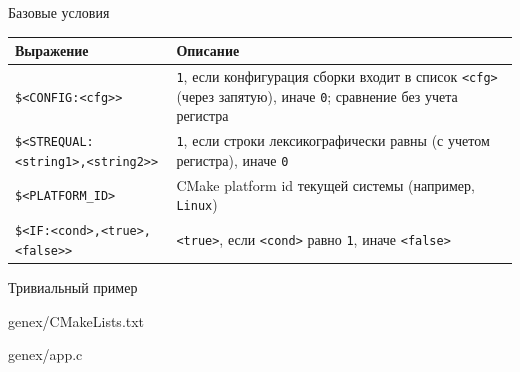 \documentclass[compress, 8pt, aspectratio=169]{beamer}
\begin{document}
\begin{frame}[fragile]{Базовые условия}

  \begin{table}[h]

    \begin{center}

      \renewcommand{\arraystretch}{1.5}

      \begin{tabular}{|p{5.5cm}|p{7.5cm}|}

        \hline

        \textbf{Выражение} & \textbf{Описание} \\

        \hline

        \texttt{\$<CONFIG:<cfg>>}
          & \texttt{1}, если конфигурация сборки входит в список
            \texttt{<cfg>} (через запятую), иначе \texttt{0};
            сравнение без учета регистра \\

        \hline

        \texttt{\$<STREQUAL:<string1>,<string2>>}
          & \texttt{1}, если строки лексикографически равны
            (с учетом регистра), иначе \texttt{0} \\

        \hline

        \texttt{\$<PLATFORM\_ID>}
          & CMake platform id текущей системы (например,
            \texttt{Linux}) \\

        \hline

        \texttt{\$<IF:<cond>,<true>,<false>>}
          & \texttt{<true>}, если \texttt{<cond>} равно \texttt{1},
            иначе \texttt{<false>} \\

        \hline

      \end{tabular}

    \end{center}

  \end{table}

\end{frame}

\begin{frame}[fragile]{Тривиальный пример}

    {genex/CMakeLists.txt}

  \bigbreak

    {genex/app.c}

\end{frame}
\end{document}
